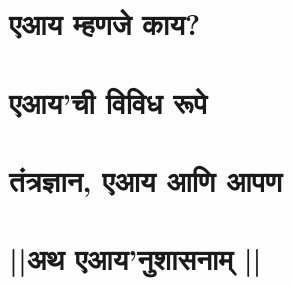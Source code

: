 


\chapter*{एआय म्हणजे काय? }




\chapter*{एआय'ची विविध रूपे }
















\chapter*{तंत्रज्ञान, एआय आणि आपण  }


\chapter*{||अथ एआय'नुशासनाम् ||}


